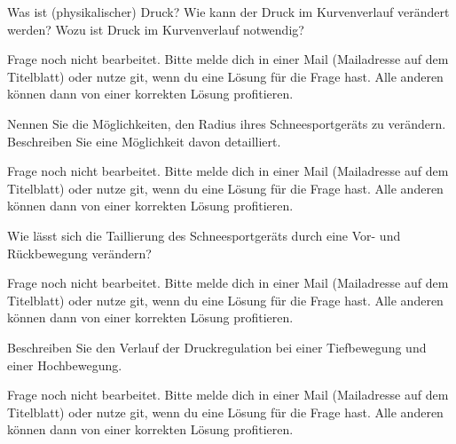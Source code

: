 \begin{question}{4}
    Was ist (physikalischer) Druck? Wie kann der Druck im Kurvenverlauf verändert werden? Wozu ist Druck im Kurvenverlauf notwendig?
\end{question}
\begin{solution}
    Frage noch nicht bearbeitet. Bitte melde dich in einer Mail (Mailadresse auf dem Titelblatt) oder nutze git, wenn du eine Lösung für die Frage hast. Alle anderen können dann von einer korrekten Lösung profitieren.
\end{solution}

\begin{question}{5}
    Nennen Sie die Möglichkeiten, den Radius ihres Schneesportgeräts zu verändern. Beschreiben Sie eine Möglichkeit davon detailliert.
\end{question}
\begin{solution}
    Frage noch nicht bearbeitet. Bitte melde dich in einer Mail (Mailadresse auf dem Titelblatt) oder nutze git, wenn du eine Lösung für die Frage hast. Alle anderen können dann von einer korrekten Lösung profitieren.
\end{solution}

\begin{question}{2}
    Wie lässt sich die Taillierung des Schneesportgeräts durch eine Vor- und Rückbewegung verändern?
\end{question}
\begin{solution}
    Frage noch nicht bearbeitet. Bitte melde dich in einer Mail (Mailadresse auf dem Titelblatt) oder nutze git, wenn du eine Lösung für die Frage hast. Alle anderen können dann von einer korrekten Lösung profitieren.
\end{solution}

\begin{question}{2}
    Beschreiben Sie den Verlauf der Druckregulation bei einer Tiefbewegung und einer Hochbewegung.
\end{question}
\begin{solution}
    Frage noch nicht bearbeitet. Bitte melde dich in einer Mail (Mailadresse auf dem Titelblatt) oder nutze git, wenn du eine Lösung für die Frage hast. Alle anderen können dann von einer korrekten Lösung profitieren.
\end{solution}